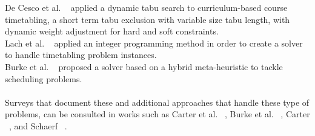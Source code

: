 De Cesco et al. ~\cite{DeCesco2008} applied a dynamic tabu search to curriculum-based course timetabling, a short term tabu exclusion with variable size tabu length, with dynamic weight adjustment for hard and soft constraints.\\
Lach et al. ~\cite{Lach2008} applied an integer programming method in order to create a solver to handle timetabling problem instances.\\
Burke et al. ~\cite{Burke2009} proposed a solver based on a hybrid meta-heuristic to tackle scheduling problems.\\
\\
Surveys that document these and additional approaches that handle these type of problems, can be consulted in works such as Carter et al. ~\cite{Carter1996}, Burke et al. ~\cite{Burke2002}, Carter ~\cite{Carter1986}, and Schaerf ~\cite{Schaerf1999}.
